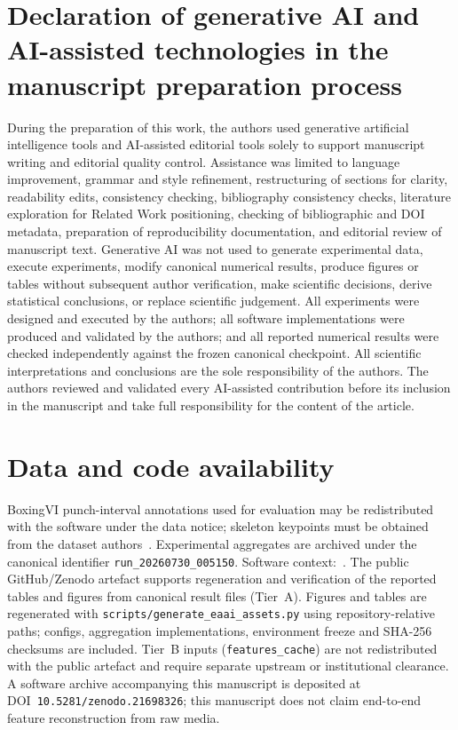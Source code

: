 \documentclass[preprint,12pt,numbers,sort&compress]{elsarticle}
\begin{document}
\section*{Declaration of generative AI and AI-assisted technologies in the manuscript preparation process}
During the preparation of this work, the authors used generative artificial intelligence tools and AI-assisted editorial tools solely to support manuscript writing and editorial quality control.
Assistance was limited to language improvement, grammar and style refinement, restructuring of sections for clarity, readability edits, consistency checking, bibliography consistency checks, literature exploration for Related Work positioning, checking of bibliographic and DOI metadata, preparation of reproducibility documentation, and editorial review of manuscript text.
Generative AI was not used to generate experimental data, execute experiments, modify canonical numerical results, produce figures or tables without subsequent author verification, make scientific decisions, derive statistical conclusions, or replace scientific judgement.
All experiments were designed and executed by the authors; all software implementations were produced and validated by the authors; and all reported numerical results were checked independently against the frozen canonical checkpoint.
All scientific interpretations and conclusions are the sole responsibility of the authors.
The authors reviewed and validated every AI-assisted contribution before its inclusion in the manuscript and take full responsibility for the content of the article.

\section*{Data and code availability}
\label{sec:reproducibility}
BoxingVI punch-interval annotations used for evaluation may be redistributed with the software under the data notice; skeleton keypoints must be obtained from the dataset authors~\cite{kumar2025boxingvi}.
Experimental aggregates are archived under the canonical identifier \texttt{run\_20260730\_005150}.
Software context:~\cite{fightsafe_ai_2026}.
The public GitHub/Zenodo artefact supports regeneration and verification of the reported tables and figures from canonical result files (Tier~A).
Figures and tables are regenerated with \texttt{scripts/generate\_eaai\_assets.py} using repository-relative paths; configs, aggregation implementations, environment freeze and SHA-256 checksums are included.
Tier~B inputs (\texttt{features\_cache}) are not redistributed with the public artefact and require separate upstream or institutional clearance.
A software archive accompanying this manuscript is deposited at DOI~\texttt{10.5281/zenodo.21698326}; this manuscript does not claim end-to-end feature reconstruction from raw media.
\end{document}
